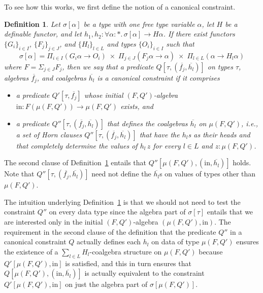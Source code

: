 \documentclass{article}[12 pt]
\newtheorem{definition}{Definition}
\theoremstyle{problemstyle}
\begin{document}
To see how this works, we first define the notion of a canonical
constraint.

\begin{definition}\label{def:can-cons}
Let $\sigma[\alpha]$ be a type with one free type variable $\alpha$,
let $H$ be a definable functor, and let $h_1, h_2 : \forall \alpha :
*.\, \sigma[\alpha] \to H \alpha$.  If there exist functors
$\{G_i\}_{i \in I}$, $\{F_j\}_{j \in J}$, and $\{H_l\}_{l \in L}$ and
types $\{O_i\}_{i \in I}$ such that
\[\sigma[\alpha] = \Pi_{i \in I} (G_i \alpha \to O_i) \; \times
  \; \Pi_{j \in J} (F_j \alpha \to \alpha) \; \times \; \Pi_{l \in L}
  (\alpha \to H_l \alpha)\]
where $F = \Sigma_{j \in J} F_j$, then we say that a predicate
$Q[\tau, (\overline{f_j}, \overline{h_l})]$ on types $\tau$, algebras
$\overline{f_j}$, and coalgebras $\overline{h_l}$ is a {\em canonical
  constraint} if it comprises
\begin{itemize}
\item a predicate $Q'[\tau,\overline{f_j}]$ whose initial
  $(F,Q')$-algebra $\mathrm{in} : F (\mu (F,Q')) \to \mu (F,Q')$
  exists, and
\item a predicate $Q''[\tau, (\overline{f_j},\overline{h_l})]$ that
  defines the coalgebras $\overline{h_l}$ on $\mu (F,Q')$, i.e., a set
  of Horn clauses $Q''[\tau, (\overline{f_j},\overline{h_l})]$ that
  have the $h_l$s as their heads and that completely determine the
  values of $h_l\,z$ for every $l \in L$ and $z : \mu(F,Q')$. 
\end{itemize}
\end{definition}
\noindent
The second clause of Definition~\ref{def:can-cons} entails that
$Q''[\mu(F,Q'), (\mathrm{in},\overline{h_l})]$ holds. Note that
$Q''[\tau, (\overline{f_j}, \overline{h_l})]$ need not define the
$\overline{h_l}$s on values of types other than $\mu (F,Q')$.

The intuition underlying Definition~\ref{def:can-cons} is that we
should not need to test the constraint $Q''$ on every data type since
the algebra part of $\sigma[\tau]$ entails that we are interested only
in the initial $(F,Q')$-algebra $(\mu(F,Q'), \mathrm{in})$. The
requirement in the second clause of the definition that the predicate
$Q''$ in a canonical constraint $Q$ actually defines each $h_l$ on
data of type $\mu (F,Q')$ ensures the existence of a $\sum_{l \in
  L}H_l$-coalgebra structure on $\mu(F,Q')$ because $Q'[\mu(F,Q'),
  \mathrm{in}]$ is satisfied, and this in turn ensures that $Q[\mu
  (F,Q'), (\mathrm{in},\overline{h_l})]$ is actually equivalent to
the constraint $Q'[\mu(F,Q'), \mathrm{in}]$ on just the algebra part
of $\sigma[\mu(F,Q')]$.
\end{document}
